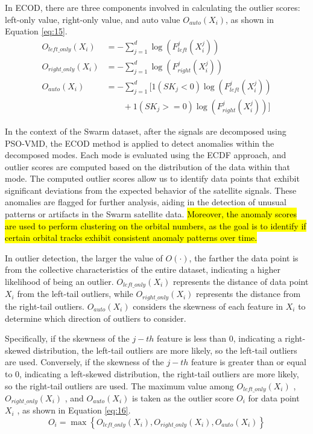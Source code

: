 \documentclass[3p,authoryear,preprint,12pt]{elsarticle}
\begin{document}
In ECOD, there are three components involved in calculating the outlier scores: left-only value, right-only value, and auto value $O_{auto}(X_i)$, as shown in Equation \ref{eq:15}.
\begin{equation}
	\label{eq:15}
	\begin{split}
		O_{left\_only}(X_i) &= - \sum_{j=1}^{d} \log \left( F_{left}^j\left( X_i^j \right) \right) \\
		O_{right\_only}(X_i) &= - \sum_{j=1}^{d} \log \left( F_{right}^j \left( X_i^j \right) \right) \\
		O_{auto}(X_i) &= - \sum_{j=1}^{d} [ 1( SK_j < 0 )\log (F_{left}^j(X_i^j)) \\ & \quad \quad + 1( SK_j >= 0 ) \log (F_{right}^j(X_i^j))]  
	\end{split}
\end{equation}

{In the context of the Swarm dataset, after the signals are decomposed using PSO-VMD, the ECOD method is applied to detect anomalies within the decomposed modes. Each mode is evaluated using the ECDF approach, and outlier scores are computed based on the distribution of the data within that mode. The computed outlier scores allow us to identify data points that exhibit significant deviations from the expected behavior of the satellite signals. These anomalies are flagged for further analysis, aiding in the detection of unusual patterns or artifacts in the Swarm satellite data.} \hl{Moreover, the anomaly scores are used to perform clustering on the orbital numbers, as the goal is to identify if certain orbital tracks exhibit consistent anomaly patterns over time.}

In outlier detection, the larger the value of $O(\cdot)$, the farther the data point is from the collective characteristics of the entire dataset, indicating a higher likelihood of being an outlier. $O_{left\_only}(X_i)$ represents the distance of data point $X_i$  from the left-tail outliers, while $O_{right\_only}(X_i)$  represents the distance from the right-tail outliers. $O_{auto}(X_i)$ considers the skewness of each feature in $X_i$  to determine which direction of outliers to consider. 

Specifically, if the skewness of the  $j-th$ feature is less than 0, indicating a right-skewed distribution, the left-tail outliers are more likely, so the left-tail outliers are used. Conversely, if the skewness of the  $j-th$ feature is greater than or equal to 0, indicating a left-skewed distribution, the right-tail outliers are more likely, so the right-tail outliers are used. The maximum value among $O_{left\_only}(X_i)$ , $O_{right\_only}(X_i)$ , and $O_{auto}(X_i)$  is taken as the outlier score $O_i$  for data point $X_i$ , as shown in Equation \ref{eq:16}.
\begin{equation}
	\label{eq:16}
	O_i = \max \left\lbrace   O_{left\_only}(X_i), O_{right\_only}(X_i), O_{auto}(X_i)   \right\rbrace 
\end{equation}
\end{document}
